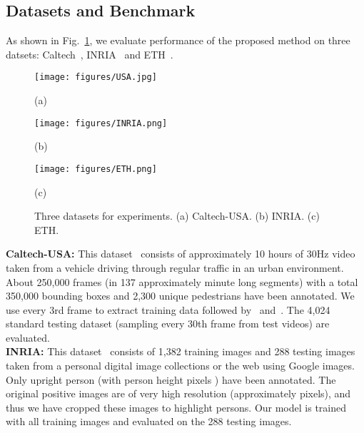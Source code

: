 \documentclass[journal]{IEEEtran}
\begin{document}
\subsection{Datasets and Benchmark}
\label{subsec:Dataset}

As shown in Fig.~\ref{fig:dataset}, we evaluate performance of the proposed method on three datsets: Caltech~\cite{Dollar2012PAMI}, INRIA~\cite{dalal2005histograms} and ETH~\cite{eth_biwi_00534}.

  \begin{figure}[t]
 \centering
\begin{minipage}[b]{0.32\linewidth}
  \centering
  \centerline{\texttt{[image: figures/USA.jpg]}}
  \centerline{(a) }
\end{minipage}
\begin{minipage}[b]{0.32\linewidth}
  \centering
  \centerline{\texttt{[image: figures/INRIA.png]}}
  \centerline{(b) }
\end{minipage}
\begin{minipage}[b]{0.32\linewidth}
  \centering
  \centerline{\texttt{[image: figures/ETH.png]}}
  \centerline{(c) }
\end{minipage}

\caption{Three datasets for experiments. (a) Caltech-USA. (b) INRIA. (c) ETH. }
\label{fig:dataset}
\end{figure}

\textbf{Caltech-USA:} This dataset~\cite{Dollar2012PAMI} consists of approximately 10 hours of  30Hz video taken from a vehicle driving through regular traffic in an urban environment. About 250,000 frames (in 137 approximately minute long segments) with a total 350,000 bounding boxes and 2,300 unique pedestrians have been annotated. We use every 3rd frame to extract training data followed by~\cite{hosang2015taking} and~\cite{nam2014local}. The 4,024 standard testing dataset (sampling every 30th frame from test videos) are evaluated.   \\

\textbf{INRIA:} This dataset~\cite{dalal2005histograms} consists of 1,382 training images and 288 testing images taken from a personal digital image collections or the web using Google images. Only upright person (with person height  pixels ) have been annotated. The original positive images are of very high resolution (approximately  pixels), and thus we have cropped these images to highlight persons. Our model is trained with all training images and evaluated on the 288 testing images.   \\
\end{document}
